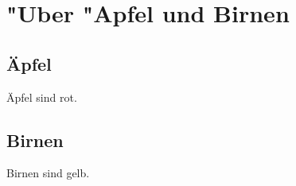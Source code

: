 \documentclass[ngerman]{article} %
\begin{document}
	\tableofcontents
	
	\section{"Uber "Apfel und Birnen}
	
	\subsection{Äpfel}
	Äpfel sind rot.
	
	\subsection{Birnen}
	Birnen sind gelb.
	
\end{document}
